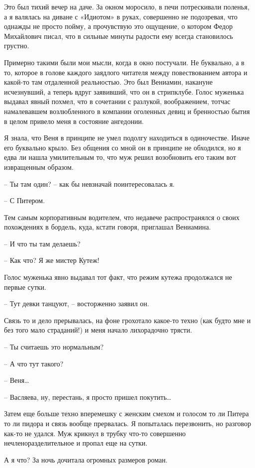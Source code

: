 \documentclass[
]{book}
\begin{document}
Это был тихий вечер на даче. За окном моросило, в печи потрескивали поленья, а я валялась на диване с «Идиотом» в руках, совершенно не подозревая, что однажды не просто пойму, а прочувствую это ощущение, о котором Федор Михайлович писал, что в сильные минуты радости ему всегда становилось грустно.

Примерно такими были мои мысли, когда в окно постучали. Не буквально, а в то, которое в голове каждого заядлого читателя между повествованием автора и какой-то там отдаленной реальностью. Это был Вениамин, накануне исчезнувший, а теперь вдруг заявивший, что он в стрипклубе. Голос муженька выдавал явный похмел, что в сочетании с разлукой, воображением, тотчас намалевавшем возлюбленного в компании оголенных девиц и бренностью бытия в целом привело меня в состояние ангедонии.

Я знала, что Веня в принципе не умел подолгу находиться в одиночестве. Иначе его буквально крыло. Без общения со мной он в принципе не обходился, но я едва ли нашла умилительным то, что муж решил возобновить его таким вот извращенным образом.

-- Ты там один? -- как бы невзначай поинтересовалась я.

-- С Питером.

Тем самым корпоративным водителем, что недавече распространялся о своих похождениях в бордель, куда, кстати говоря, приглашал Вениамина.

-- И что ты там делаешь?

-- Как что? Я же мистер Кутеж!

Голос муженька явно выдавал тот факт, что режим кутежа продолжался не первые сутки.

-- Тут девки танцуют, -- восторженно заявил он.

Связь то и дело прерывалась, на фоне грохотало какое-то техно (как будто мне и без того мало страданий!) и меня начало лихорадочно трясти.

-- Ты считаешь это нормальным?

-- А что тут такого?

-- Веня\ldots{}

-- Васляева, ну, перестань, я просто пришел покутить\ldots{}

Затем еще больше техно вперемешку с женским смехом и голосом то ли Питера то ли пидора и связь вообще прервалась. Я попыталась перезвонить, но разговор как-то не удался. Муж крикнул в трубку что-то совершенно нечленоразделительное и пропал еще на сутки.

А я что? За ночь дочитала огромных размеров роман.
\end{document}
